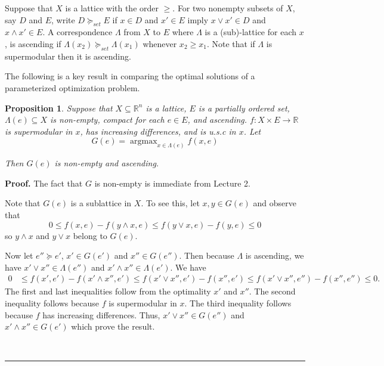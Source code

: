 \documentclass[letter,11pt]{article}
\newtheorem{proposition}{Proposition}[section]
\newenvironment {proof}[1][Proof]{\noindent \textbf {#1.} }{\ \rule {0.5em}{0.5em}}
\begin{document}
Suppose that $X$ is a lattice with the order $\geq$. For two nonempty subsets of $X$, say $D$ and $E$, write $D \succeq _{set} E$ if $x \in D$ and $x' \in E$ imply $x \lor x' \in D$ and $x \land x' \in E$. A correspondence $\Lambda$ from $X$ to $E$ where $\Lambda$ is a (sub)-lattice for each $x$, is ascending if $\Lambda (x_{2}) \succeq_{set} \Lambda(x_{1})$ whenever $x_{2} \geq x_{1}$.  Note that if $\Lambda$ is supermodular then it is ascending.  

The following is a key result in comparing the optimal solutions of a parameterized optimization problem. 

\begin{proposition} \label{Prop:topkis}
    Suppose that $X  
    \subseteq \mathbb{R}^{n}$ is a lattice, $E$ is a partially ordered set, $\Lambda(e) \subseteq X$ is non-empty, compact for each $e \in E$, and ascending. $f:X \times E \rightarrow \mathbb{R}$ is supermodular in $x$, has increasing differences, and is u.s.c in $x$.  Let 
    $$G(e) = \operatorname{argmax} _{x \in \Lambda(e)} f(x,e)$$ 
    
    Then  $G(e)$ is non-empty and ascending. 

  
\end{proposition} 
\begin{proof}
The fact that $G$ is non-empty is immediate from Lecture 2.  

Note that $G(e)$ is a sublattice in $X$. 
To see this, let $x , y \in G(e)$ and observe that 
$$ 0 \leq f(x,e) - f(y \land x,e) \leq f(y \lor x , e) - f(y,e) \leq 0 $$
so $y \land x$ and $y \lor x$ belong to $G(e)$. 




Now let $e'' \succeq e'$, $x' \in G(e')$ and $x'' \in G(e'')$. Then because $\Lambda$ is ascending, we have $x' \lor x'' \in \Lambda(e'')$ and $x' \land x'' \in \Lambda(e')$. We have 
\begin{align*}
   0 & \leq f(x',e') - f(x' \land x'',e')  \leq f(x' \lor x'',e') - f(x'',e')   \leq f(x' \lor x'',e'') - f(x'',e'') \leq 0.
\end{align*}
The first and last inequalities follow from the optimality $x'$ and $x''$. The second inequality follows because $f$ is supermodular in $x$. The third inequality follows because $f$ has increasing differences.  Thus, $x' \lor x'' \in G(e'')$ and $x' \land x'' \in G(e')$ which prove the result. 



\end{proof}
\end{document}
